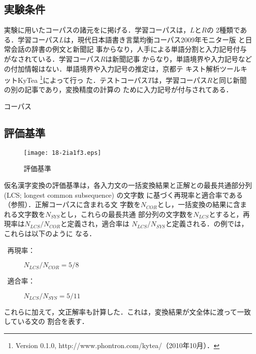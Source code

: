 \documentclass[japanese]{jnlp_JS2.0}
\def\tabref#1{}
\def\figref#1{}
\begin{document}
\subsection{実験条件}

実験に用いたコーパスの諸元を\tabref{table:corpus}に掲げる．学習コーパスは，$L$と$R$の
2種類である．学習コーパス$L$は，現代日本語書き言葉均衡コーパス2009年モニター版
\cite{Balanced.Corpus.of.Contemporary.Written.Japanese}と日常会話の辞書の例文と新聞記
事からなり，人手による単語分割と入力記号付与がなされている．学習コーパス$R$は新聞記事
からなり，単語境界や入力記号などの付加情報はない．単語境界や入力記号の推定は，京都テ
キスト解析ツールキットKyTea \cite{点推定と能動学習を用いた自動単語分割器の分野適応}
\footnote{Version 0.1.0, http://www.phontron.com/kytea/（2010年10月）．}によって行っ
た．テストコーパス$T$は，学習コーパス$R$と同じ新聞の別の記事であり，変換精度の計算の
ために入力記号が付与されてある．

\begin{table}[tb]
\caption{コーパス}

  \label{table:corpus}
\vspace{1\baselineskip}
\end{table}


\subsection{評価基準}

\begin{figure}[tb]
\begin{center}
\texttt{[image: 18-2ia1f3.eps]}
\end{center}
  \caption{評価基準}
  \label{figure:criteria}
\end{figure}

仮名漢字変換の評価基準は，各入力文の一括変換結果と正解との最長共通部分列(LCS;
longest common subsequence) \cite{文字列中のパターン照合のためのアルゴリズム}の文字数
に基づく再現率と適合率である（\figref{figure:criteria}参照）．正解コーパスに含まれる文
字数を$N_{COR}$とし，一括変換の結果に含まれる文字数を$N_{SYS}$とし，これらの最長共通
部分列の文字数を$N_{LCS}$とすると，再現率は$N_{LCS}/N_{COR}$と定義され，適合率は
$N_{LCS}/N_{SYS}$と定義される．\figref{figure:criteria}の例では，これらは以下のように
なる．
\begin{description}
\item[\ 再現率：] $N_{LCS}/N_{COR} =  5/8$
\item[\ 適合率：] $N_{LCS}/N_{SYS} = 5/11$
\end{description}
これらに加えて，文正解率も計算した．これは，変換結果が文全体に渡って一致している文の
割合を表す．
\end{document}
